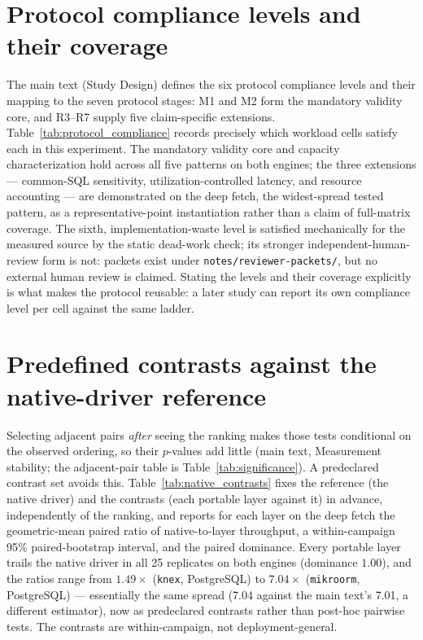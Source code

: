 \documentclass[11pt,a4paper]{article}
\newcommand{\tabledir}{tables/}
\begin{document}


\section{Protocol compliance levels and their coverage}
\label{sup:protocol-compliance}
The main text (Study Design) defines the six protocol compliance levels and their mapping to the
seven protocol stages: M1 and M2 form the mandatory validity core, and R3--R7 supply five
claim-specific extensions. Table~\ref{tab:protocol_compliance}
records precisely which workload cells satisfy each in this experiment. The mandatory validity core
and capacity characterization hold across all five patterns on both engines; the three
extensions --- common-SQL sensitivity, utilization-controlled latency, and resource accounting --- are
demonstrated on the deep fetch, the widest-spread tested pattern, as a representative-point
instantiation rather than a claim of full-matrix coverage. The sixth, implementation-waste level is satisfied mechanically for the measured source by the static dead-work check; its stronger independent-human-review form is not: packets exist under \texttt{notes/reviewer-packets/}, but no external human review is claimed. Stating the levels and their coverage
explicitly is what makes the protocol reusable: a later study can report its own compliance level per
cell against the same ladder.



\section{Predefined contrasts against the native-driver reference}
\label{sup:native-contrasts}
Selecting adjacent pairs \emph{after} seeing the ranking makes those tests conditional on the observed
ordering, so their $p$-values add little (main text, Measurement stability; the adjacent-pair table is
Table~\ref{tab:significance}). A predeclared contrast set avoids this. Table~\ref{tab:native_contrasts}
fixes the reference (the native driver) and the contrasts (each portable layer against it) in advance,
independently of the ranking, and reports for each layer on the deep fetch the geometric-mean paired
ratio of native-to-layer throughput, a within-campaign 95\% paired-bootstrap interval, and the paired
dominance. Every portable layer trails the native driver in all 25 replicates on both engines
(dominance $1.00$), and the ratios range from $1.49\times$ (\texttt{knex}, PostgreSQL) to $7.04\times$
(\texttt{mikroorm}, PostgreSQL) --- essentially the same spread (7.04 against the main text's 7.01, a different estimator), now as predeclared contrasts
rather than post-hoc pairwise tests. The contrasts are within-campaign, not deployment-general.
\end{document}

